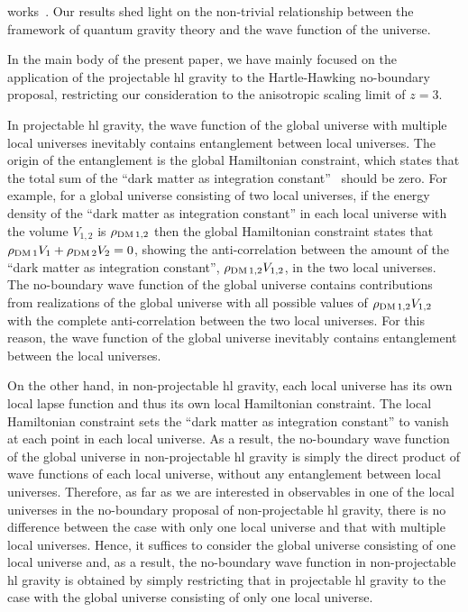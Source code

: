\documentclass[superscriptaddress,aps,preprintnumbers,nofootinbib]{revtex4-2}
\begin{document}
works~\cite{Matsui:2021yte,Martens:2022dtd}. Our results shed light on the non-trivial relationship between the framework of quantum gravity theory and the wave function of the universe.



In the main body of the present paper, we have mainly focused on the application of the projectable \ac{hl} gravity to the Hartle-Hawking no-boundary proposal, restricting our consideration to the anisotropic scaling limit of $z=3$. 


In projectable \ac{hl} gravity, the wave function of the global universe with multiple local universes inevitably contains entanglement between local universes. The origin of the entanglement is the global Hamiltonian constraint, which states that the total sum of the ``dark matter as integration constant''~\cite{Mukohyama:2009mz,Mukohyama:2009tp} should be zero. For example, for a global universe consisting of two local universes, if the energy density of the ``dark matter as integration constant'' in each local universe with the volume $V_{1,2}$ is $\rho_{{\rm DM}\, 1,2}$ then the global Hamiltonian constraint states that $\rho_{{\rm DM}\, 1}V_1+\rho_{{\rm DM}\, 2}V_2=0$, showing the anti-correlation between the amount of the ``dark matter as integration constant'', $\rho_{{\rm DM}\, 1,2}V_{1,2}$, in the two local universes. The no-boundary wave function of the global universe contains contributions from realizations of the global universe with all possible values of $\rho_{{\rm DM}\, 1,2}V_{1,2}$ with the complete anti-correlation between the two local universes. For this reason, the wave function of the global universe inevitably contains entanglement between the local universes. 


On the other hand, in non-projectable \ac{hl} gravity, each local universe has its own local lapse function and thus its own local Hamiltonian constraint. The local Hamiltonian constraint sets the ``dark matter as integration constant'' to vanish at each point in each local universe. As a result, the no-boundary wave function of the global universe in non-projectable \ac{hl} gravity is simply the direct product of wave functions of each local universe, without any entanglement between local universes. Therefore, as far as we are interested in observables in one of the local universes in the no-boundary proposal of non-projectable \ac{hl} gravity, there is no difference between the case with only one local universe and that with multiple local universes. Hence, it suffices to consider the global universe consisting of one local universe and, as a result, the no-boundary wave function in non-projectable \ac{hl} gravity is obtained by simply restricting that in projectable \ac{hl} gravity to the case with the global universe consisting of only one local universe. 
\end{document}
